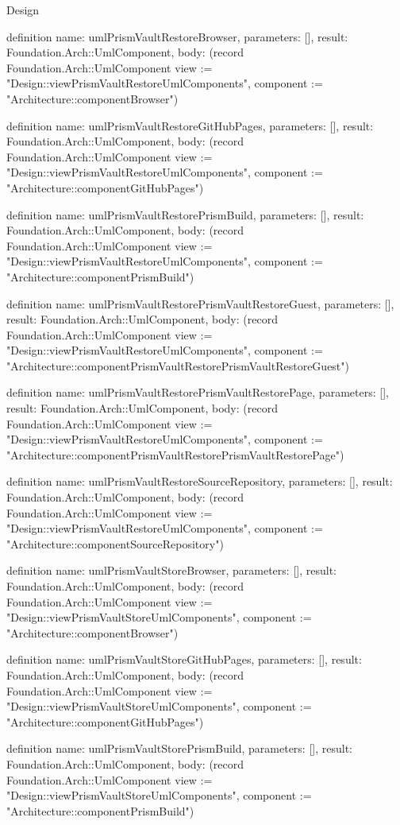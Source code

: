 \begin{lexlean}{Design}
\begin{semanticmodule}
definition{
  name: umlPrismVaultRestoreBrowser,
  parameters: [],
  result: Foundation.Arch::UmlComponent,
  body: (record Foundation.Arch::UmlComponent {view := "Design::viewPrismVaultRestoreUmlComponents", component := "Architecture::componentBrowser"})
}

definition{
  name: umlPrismVaultRestoreGitHubPages,
  parameters: [],
  result: Foundation.Arch::UmlComponent,
  body: (record Foundation.Arch::UmlComponent {view := "Design::viewPrismVaultRestoreUmlComponents", component := "Architecture::componentGitHubPages"})
}

definition{
  name: umlPrismVaultRestorePrismBuild,
  parameters: [],
  result: Foundation.Arch::UmlComponent,
  body: (record Foundation.Arch::UmlComponent {view := "Design::viewPrismVaultRestoreUmlComponents", component := "Architecture::componentPrismBuild"})
}

definition{
  name: umlPrismVaultRestorePrismVaultRestoreGuest,
  parameters: [],
  result: Foundation.Arch::UmlComponent,
  body: (record Foundation.Arch::UmlComponent {view := "Design::viewPrismVaultRestoreUmlComponents", component := "Architecture::componentPrismVaultRestorePrismVaultRestoreGuest"})
}

definition{
  name: umlPrismVaultRestorePrismVaultRestorePage,
  parameters: [],
  result: Foundation.Arch::UmlComponent,
  body: (record Foundation.Arch::UmlComponent {view := "Design::viewPrismVaultRestoreUmlComponents", component := "Architecture::componentPrismVaultRestorePrismVaultRestorePage"})
}

definition{
  name: umlPrismVaultRestoreSourceRepository,
  parameters: [],
  result: Foundation.Arch::UmlComponent,
  body: (record Foundation.Arch::UmlComponent {view := "Design::viewPrismVaultRestoreUmlComponents", component := "Architecture::componentSourceRepository"})
}

definition{
  name: umlPrismVaultStoreBrowser,
  parameters: [],
  result: Foundation.Arch::UmlComponent,
  body: (record Foundation.Arch::UmlComponent {view := "Design::viewPrismVaultStoreUmlComponents", component := "Architecture::componentBrowser"})
}

definition{
  name: umlPrismVaultStoreGitHubPages,
  parameters: [],
  result: Foundation.Arch::UmlComponent,
  body: (record Foundation.Arch::UmlComponent {view := "Design::viewPrismVaultStoreUmlComponents", component := "Architecture::componentGitHubPages"})
}

definition{
  name: umlPrismVaultStorePrismBuild,
  parameters: [],
  result: Foundation.Arch::UmlComponent,
  body: (record Foundation.Arch::UmlComponent {view := "Design::viewPrismVaultStoreUmlComponents", component := "Architecture::componentPrismBuild"})
}


\end{semanticmodule}
\end{lexlean}
